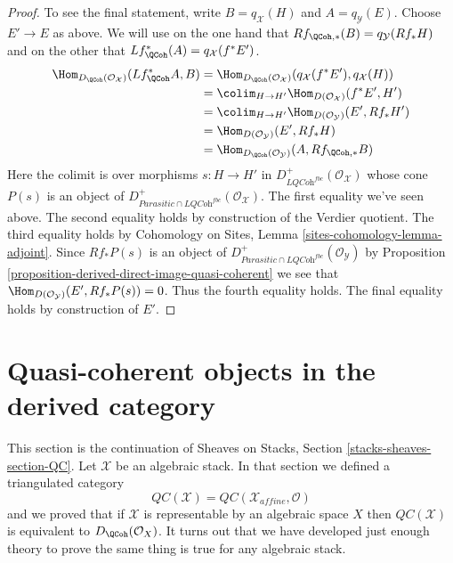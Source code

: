 \begin{proof}
\medskip\noindent
To see the final statement, write $B = q_\mathcal{X}(H)$ and
$A = q_\mathcal{Y}(E)$.
Choose $E' \to E$ as above.
We will use on the one hand that
$Rf_{\QCoh, *}(B) = q_\mathcal{Y}(Rf_*H)$
and on the other that
$Lf^*_\QCoh(A) = q_\mathcal{X}(f^*E')$.
\begin{align*}
\Hom_{D_\QCoh(\mathcal{O}_\mathcal{X})}(Lf^*_\QCoh A, B)
& = 
\Hom_{D_\QCoh(\mathcal{O}_\mathcal{X})}(q_\mathcal{X}(f^*E'),
q_\mathcal{X}(H)) \\
& = 
\colim_{H \to H'} \Hom_{D(\mathcal{O}_\mathcal{X})}(f^*E', H') \\
& = \colim_{H \to H'} \Hom_{D(\mathcal{O}_\mathcal{Y})}(E', Rf_*H') \\
& = \Hom_{D(\mathcal{O}_\mathcal{Y})}(E', Rf_*H) \\
& =
\Hom_{D_\QCoh(\mathcal{O}_\mathcal{Y})}(A, Rf_{\QCoh, *}B)
\end{align*}
Here the colimit is over morphisms $s : H \to H'$ in
$D^+_{\textit{LQCoh}^{fbc}}(\mathcal{O}_\mathcal{X})$
whose cone $P(s)$ is an object of
$D^+_{\textit{Parasitic} \cap \textit{LQCoh}^{fbc}}(\mathcal{O}_\mathcal{X})$.
The first equality we've seen above.
The second equality holds by construction of the Verdier quotient.
The third equality holds by
Cohomology on Sites, Lemma \ref{sites-cohomology-lemma-adjoint}.
Since $Rf_*P(s)$ is an object of
$D^+_{\textit{Parasitic} \cap \textit{LQCoh}^{fbc}}(\mathcal{O}_\mathcal{Y})$
by
Proposition \ref{proposition-derived-direct-image-quasi-coherent}
we see that $\Hom_{D(\mathcal{O}_\mathcal{Y})}(E', Rf_*P(s)) = 0$.
Thus the fourth equality holds. The final equality
holds by construction of $E'$.
\end{proof}








\section{Quasi-coherent objects in the derived category}
\label{section-QC}

\noindent
This section is the continuation of Sheaves on Stacks, Section
\ref{stacks-sheaves-section-QC}. Let $\mathcal{X}$ be an algebraic stack.
In that section we defined a triangulated category
$$
\mathit{QC}(\mathcal{X}) = \mathit{QC}(\mathcal{X}_{affine}, \mathcal{O})
$$
and we proved that if $\mathcal{X}$ is representable by an algebraic space $X$
then $\mathit{QC}(\mathcal{X})$ is equivalent to $D_\QCoh(\mathcal{O}_X)$.
It turns out that we have developed just enough theory to prove the same
thing is true for any algebraic stack.


